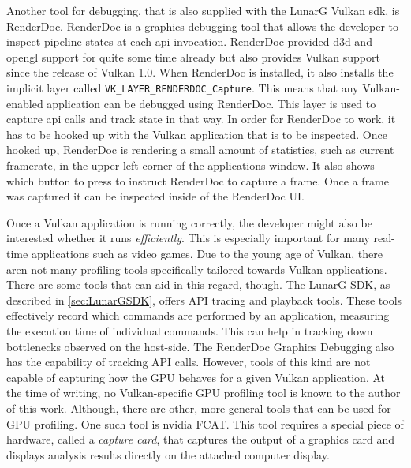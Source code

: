     Another tool for debugging, that is also supplied with the LunarG Vulkan \gls{sdk}, is RenderDoc\cite{renderdoc}. RenderDoc is a graphics debugging tool that allows the developer to inspect pipeline states at each \gls{api} invocation. RenderDoc provided \gls{d3d} and \gls{opengl} support for quite some time already but also provides Vulkan support since the release of Vulkan 1.0. When RenderDoc is installed, it also installs the implicit layer called \lstinline{VK_LAYER_RENDERDOC_Capture}. This means that any Vulkan-enabled application can be debugged using RenderDoc. This layer is used to capture \gls{api} calls and track state in that way. In order for RenderDoc to work, it has to be hooked up with the Vulkan application that is to be inspected. Once hooked up, RenderDoc is rendering a small amount of statistics, such as current framerate, in the upper left corner of the applications window. It also shows which button to press to instruct RenderDoc to capture a frame. Once a frame was captured it can be inspected inside of the RenderDoc UI.

    Once a Vulkan application is running correctly, the developer might also be interested whether it runs \textit{efficiently}. This is especially important for many real-time applications such as video games. Due to the young age of Vulkan, there aren not many profiling tools specifically tailored towards Vulkan applications. There are some tools that can aid in this regard, though. The LunarG SDK, as described in \ref{sec:LunarGSDK}, offers API tracing and playback tools. These tools effectively record which commands are performed by an application, measuring the execution time of individual commands. This can help in tracking down bottlenecks observed on the host-side. The RenderDoc Graphics Debugging\cite{renderdoc} also has the capability of tracking API calls. However, tools of this kind are not capable of capturing how the GPU behaves for a given Vulkan application. At the time of writing, no Vulkan-specific GPU profiling tool is known to the author of this work. Although, there are other, more general tools that can be used for GPU profiling. One such tool is \gls{nvidia} FCAT\cite{nvidiafcat}. This tool requires a special piece of hardware, called a \textit{capture card}, that captures the output of a graphics card and displays analysis results directly on the attached computer display. 


